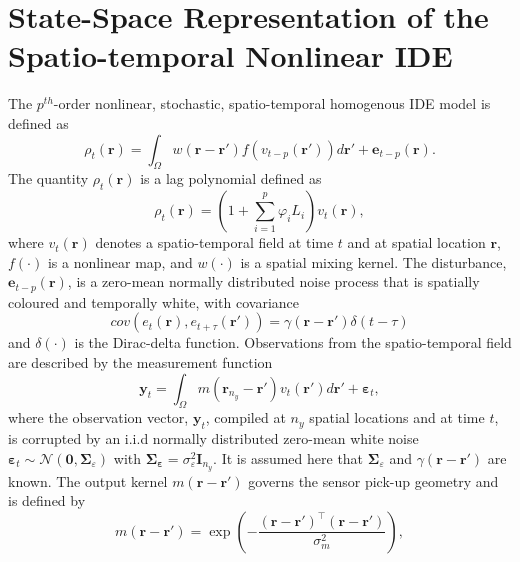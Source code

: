 \documentclass[a4paper,10pt]{article}
\begin{document}
\section{State-Space Representation of the Spatio-temporal Nonlinear IDE}
The $p^{th}$-order nonlinear, stochastic, spatio-temporal homogenous IDE model is defined as
 \begin{equation}\label{eq:IDEModel}
  \rho_t(\mathbf r)=\int_{\Omega}w(\mathbf r-\mathbf r')f(v_{t-p}(\mathbf r'))d\mathbf r'+\mathbf e_{t-p}(\mathbf r). 
 \end{equation}
The quantity $\rho_t(\mathbf r)$ is a lag polynomial defined as
\begin{equation}\label{eq:LagPolynomial}
 \rho_t(\mathbf r)=(1+\sum_{i=1}^{p}\varphi_i L_i)v_{t}\left(\mathbf r\right),
\end{equation}
where $v_t(\mathbf r)$ denotes a spatio-temporal field at time $t$ and at spatial location $\mathbf r$, $f(\cdot)$ is a nonlinear map, and $w(\cdot)$ is a spatial mixing kernel. The disturbance, $\mathbf e_{t-p}(\mathbf r)$, is a zero-mean normally distributed noise process that is spatially
coloured and temporally white, with covariance
\begin{equation}
cov\left(e_{t}\left(\mathbf{r}\right),e_{t+\tau}\left(\mathbf{r'}\right)\right)=
\gamma\left(\mathbf{r}-\mathbf{r'}\right)\delta(t-\tau)
\label{eq:FieldCovariance}
\end{equation}
and $\delta(\cdot)$ is the Dirac-delta function.
Observations from the spatio-temporal field are described by the measurement function
\begin{equation}
    \label{eq:ObservationEquation}
	\mathbf{y}_t =
	\int_{\Omega}{
	    m\left(\mathbf{r}_{n_y}-\mathbf{r}'\right)v_t\left(\mathbf{r}'\right)
	d\mathbf{r}'} + 
	\boldsymbol{\varepsilon}_t, 
\end{equation}
where the observation vector, $\mathbf{y}_{t}$, compiled at $n_{y}$ spatial locations and at time $t$, is corrupted by an i.i.d normally distributed zero-mean white noise ${\boldsymbol\varepsilon}_t\sim \mathcal{N}\left(\mathbf{0},\boldsymbol\Sigma_{\varepsilon}\right)$ with $\mathbf{\Sigma}_{\boldsymbol\varepsilon}=\sigma_{\varepsilon}^2\mathbf I_{n_y} $. It is assumed here that $\boldsymbol\Sigma_{\varepsilon}$ and $\gamma\left(\mathbf r-\mathbf r' \right)$ are known. The output kernel $m(\mathbf{r}-\mathbf{r}')$ governs the sensor pick-up geometry and is defined by 
\begin{equation}\label{eq:SensorKernel}
	m\left(\mathbf{r}-\mathbf{r}'\right) = \exp{\left(-\frac{(\mathbf{r}-\mathbf{r}')^\top(\mathbf{r}-\mathbf{r}')}{\sigma_m^2}\right)},
\end{equation}
\end{document}
